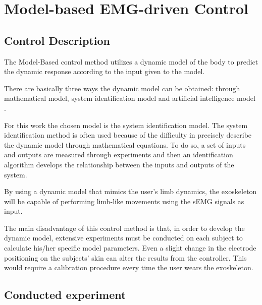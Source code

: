 \chapter{Model-based EMG-driven Control}
\label{ch:ModelControl}


\section{Control Description}

The Model-Based control method utilizes a dynamic model of the body to predict the dynamic response according to the input given to the model.

There are basically three ways the dynamic model can be obtained: through mathematical model, system identification model and artificial intelligence model \cite{Anam2012988}.

For this work the chosen model is the system identification model.  The system identification method is often used because of the difficulty in precisely describe the dynamic model through mathematical equations. To do so, a set of inputs and outputs are measured through experiments and then an identification algorithm develops the relationship between the inputs and outputs of the system.


By using a dynamic model that mimics the user's limb dynamics, the exoskeleton will be capable of performing limb-like movements using the sEMG signals as input.

The main disadvantage of this control method is that, in order to develop the dynamic model, extensive experiments must be conducted on each subject to calculate his/her specific model parameters. Even a slight change in the electrode positioning on the subjects' skin can alter the results from the controller. This would require a calibration procedure every time the user wears the exoskeleton.

\section{Conducted experiment}

